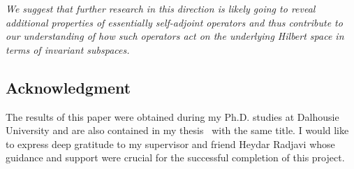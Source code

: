 \documentclass{tran-l}
\theoremstyle{definition}
\theoremstyle{remark}
\numberwithin{equation}{subsection}
\begin{document}
\emph{We suggest that further research in this direction is likely going to reveal additional properties of essentially self-adjoint operators and thus contribute to our understanding of how such operators act on the underlying Hilbert space in terms of invariant subspaces.}


\subsection*{Acknowledgment}
The results of this paper were obtained during my Ph.D. studies at Dalhousie University and are also contained in my thesis~\cite{Sim94} with the same title. I would like to express deep gratitude to my supervisor and friend Heydar Radjavi whose guidance and support were crucial for the successful completion of this project.



\end{document}

